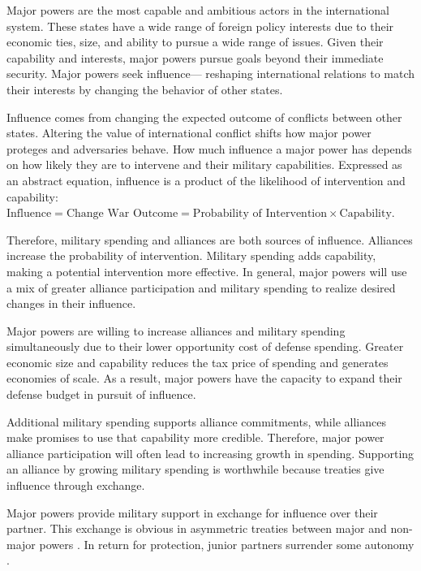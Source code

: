 \documentclass[12pt]{article}
\begin{document}
Major powers are the most capable and ambitious actors in the international system. 
These states have a wide range of foreign policy interests due to their economic ties, size, and ability to pursue a wide range of issues. 
Given their capability and interests, major powers pursue goals beyond their immediate security. 
Major powers seek influence--- reshaping international relations to match their interests by changing the behavior of other states. 


Influence comes from changing the expected outcome of conflicts between other states.
Altering the value of international conflict shifts how major power proteges and adversaries behave.  
How much influence a major power has depends on how likely they are to intervene and their military capabilities. 
Expressed as an abstract equation, influence is a product of the likelihood of intervention and capability: $\mbox{Influence} = \mbox{Change War Outcome} = \mbox{Probability of Intervention} \times \mbox{Capability}$.


Therefore, military spending and alliances are both sources of influence. 
Alliances increase the probability of intervention. 
Military spending adds capability, making a potential intervention more effective. 
In general, major powers will use a mix of greater alliance participation and military spending to realize desired changes in their influence. 


Major powers are willing to increase alliances and military spending simultaneously due to their lower opportunity cost of defense spending. 
Greater economic size and capability reduces the tax price of spending and generates economies of scale. 
As a result, major powers have the capacity to expand their defense budget in pursuit of influence.  


Additional military spending supports alliance commitments, while alliances make promises to use that capability more credible. 
Therefore, major power alliance participation will often lead to increasing growth in spending. 
Supporting an alliance by growing military spending is worthwhile because treaties give influence through exchange. 


Major powers provide military support in exchange for influence over their partner. 
This exchange is obvious in asymmetric treaties between major and non-major powers \citep{Morrow1991}. 
In return for protection, junior partners surrender some autonomy \citep{Lake2009}. 
\end{document}
